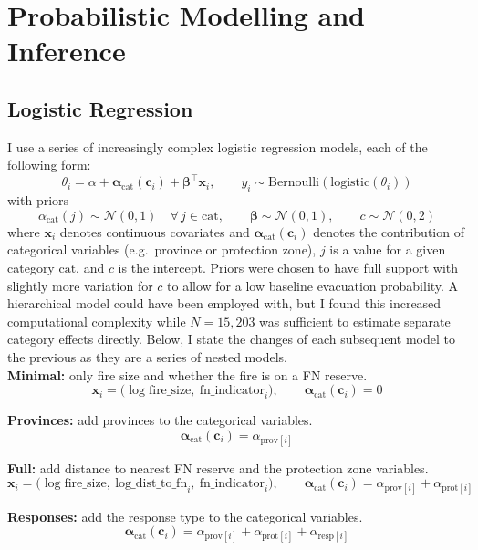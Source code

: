\section{Probabilistic Modelling and Inference}\label{sec:modelling}
\subsection{Logistic Regression}\label{sec:first_model}
I use a series of increasingly complex logistic regression models, each of the following form:
\[
\theta_i
=
\alpha
+ \mathbf{\alpha}_{\mathrm{cat}}(\mathbf{c}_i)
+ \boldsymbol{\beta}^\top \mathbf{x}_i,
\qquad
y_i \sim \mathrm{Bernoulli}\!\left(\mathrm{logistic}(\theta_i)\right)
\]
with priors
\[
\alpha_{\mathrm{cat}}(j) \sim \mathcal{N}(0,1) \quad \forall \, j\in \mathrm{cat}, \qquad 
\boldsymbol{\beta} \sim \mathcal{N}(0,1), \qquad
c \sim \mathcal{N}(0,2)
\]
where \(\mathbf{x}_i\) denotes continuous covariates and \(\mathbf{\alpha}_{\mathrm{cat}}(\mathbf{c}_i)\) denotes the contribution of categorical variables (e.g.\ province or protection zone), $j$ is a value for a given category $\mathrm{cat}$, and $c$ is the intercept. Priors were chosen to have full support with slightly more variation for $c$ to allow for a low baseline evacuation probability. A hierarchical model could have been employed with, but I found this increased computational complexity while $N=15,203$ was sufficient to estimate separate category effects directly. Below, I state the changes of each subsequent model to the previous as they are a series of nested models.\\
\textbf{Minimal:} only fire size and whether the fire is on a FN reserve.
\[
\mathbf{x}_i = \big(\log \text{fire\_size},\ \text{fn\_indicator}_i\big),
\qquad
\mathbf{\alpha}_{\mathrm{cat}}(\mathbf{c}_i) = 0
\]

\textbf{Provinces:} add provinces to the categorical variables.
\[
\mathbf{\alpha}_{\mathrm{cat}}(\mathbf{c}_i) = \alpha_{\mathrm{prov}[i]}
\]

\textbf{Full:} add distance to nearest FN reserve and the protection zone variables.
\[
\mathbf{x}_i = \big(\log \text{fire\_size},\ \text{log\_dist\_to\_fn}_i,\ \text{fn\_indicator}_i\big),
\qquad
\mathbf{\alpha}_{\mathrm{cat}}(\mathbf{c}_i)
=
\alpha_{\mathrm{prov}[i]} + \alpha_{\mathrm{prot}[i]}
\]

\textbf{Responses:} add the response type to the categorical variables.
\[
\mathbf{\alpha}_{\mathrm{cat}}(\mathbf{c}_i)
=
\alpha_{\mathrm{prov}[i]} + \alpha_{\mathrm{prot}[i]} + \alpha_{\mathrm{resp}[i]}
\]

